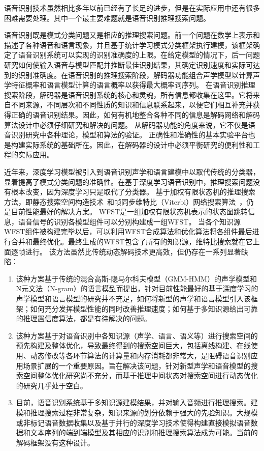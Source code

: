 语音识别技术虽然相比多年以前已经有了长足的进步，但是在实际应用中还有很多困难需要处理。其中一个最主要难题就是语音识别推理搜索问题。

语音识别既是模式分类问题又是相应的推理搜索问题。前一个问题在数学上表示和描述了各种语音和语言现象，并且基于统计学习模式分类框架执行建模，该框架确定了语音识别系统可以实现的识别准确度的上限。在给定模型的情况下，后一问题研究如何使输入语音与模型匹配并推断最佳识别结果，其确定识别速度和实际可达到的识别准确度。在语音识别的推理搜索阶段，解码器功能组合声学模型以计算声学特征概率和语言模型计算的语言概率以获得最大概率词序列。
在语音识别推理搜索阶段，解码器是语音识别系统的核心和灵魂，所有信息都收集在这里。它将来自不同来源，不同层次和不同性质的知识和信息联系起来，以便它们相互补充并获得正确的语音识别结果。因此，如何有机地整合各种不同的信息是解码网络和解码算法设计中必须仔细研究和解决的问题。
从解码器功能的角度来说，它不仅是语音识别研究中各种理论，模型和算法的验证。
正确性和准确性的基本实验平台也是构建实际系统的基础所在。因此，在解码器的设计中必须平衡研究的便利性和工程的实际应用。


近年来，深度学习模型被引入到语音识别声学和语言建模中以取代传统的分类器，显着提高了模式分类问题的准确性。在基于深度学习语音识别中，推理搜索问题没有根本改变，因为深度学习只是取代了分类器。
基于加权有限状态机的推理搜索方法，即静态搜索空间构造技术~\cite{mohri2002weighted}和帧同步维特比（Viterbi）网络搜索算法~\cite{forney1973viterbi}，仍是目前性能最好的解决方案。
WFST是一组加权有限状态机表示的状态图跳转信息，语音信号的识别各模型组件可以分别构建成一组WFST。
当各个知识源WFST组件被构建完毕以后，可以利用WFST合成算法和优化算法将各组件最后进行合并和最终优化。最终生成的WFST包含了所有的知识源，维特比搜索就在它上面逐帧进行。
该方法虽然比传统动态解码技术更高效，但仍存在一系列显著缺陷：
\begin{enumerate}
\item 
该种方案基于传统的混合高斯-隐马尔科夫模型（GMM-HMM）的声学模型和N元文法（N-gram）的语言模型而提出，针对目前性能最好的基于深度学习的声学模型和语言模型的研究并不充足，如何将新型的声学和语言模型引入该框架；如何充分发挥模型性能的同时改善推理速度；如何基于多知识源给出可靠的推理置信度算法，都是有待解决的问题。
\item 
该种方案基于对语音识别中各知识源（声学、语言、语义等）进行搜索空间的预先构建及整体优化，导致最终得到的搜索空间巨大，包括离线构建、在线使用、动态修改等各环节算法的计算量和内存消耗都非常大，是阻碍语音识别应用场景扩展的一个重要原因。旨在解决该问题，针对新型声学和语音模型的搜索空间整体优化研究尚不充分，而基于推理中间状态对搜索空间进行动态优化的研究几乎处于空白。
\item 目前，语音识别系统基于多知识源建模结果，并对输入音频进行推理搜索。建模和推理搜索过程非常复杂，知识来源的划分依赖于强大的先验知识。大规模或非标记语音数据收集以及基于并行的深度学习技术使得构建直接模拟语音数据和文本序列的端到端模型及其相应的识别和推理搜索算法成为可能。当前的解码框架没有这种设计。
\end{enumerate}

